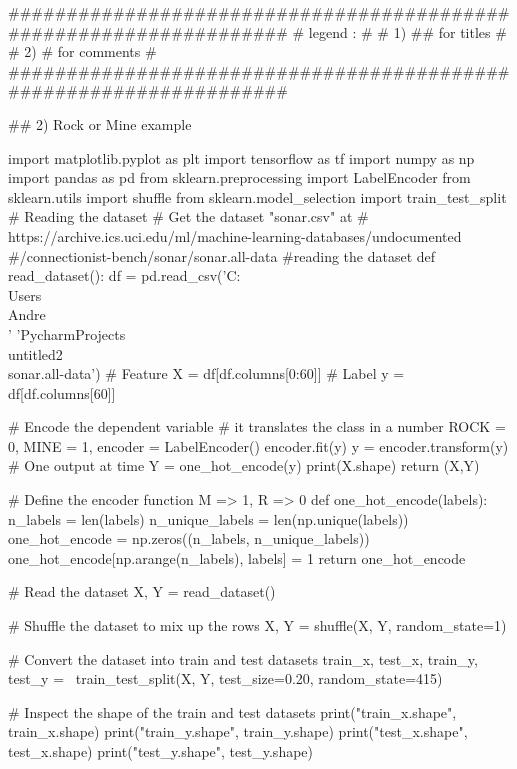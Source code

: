 \documentclass[11pt]{article}
\begin{document}
\begin{python}
###################################################################
# legend :                                                        #
#         1) ## for titles                                        #
#         2) #  for comments                                      #
###################################################################

## 2) Rock or Mine example

import matplotlib.pyplot as plt
import tensorflow as tf
import numpy as np
import pandas as pd
from sklearn.preprocessing import LabelEncoder
from sklearn.utils import shuffle
from sklearn.model_selection import train_test_split
# Reading the dataset
# Get the dataset "sonar.csv" at
# https://archive.ics.uci.edu/ml/machine-learning-databases/undocumented
#/connectionist-bench/sonar/sonar.all-data
#reading the dataset
def read_dataset():
    df = pd.read_csv('C:\\Users\\Andre\\'
                     'PycharmProjects\\untitled2\\sonar.all-data')
    # Feature
    X = df[df.columns[0:60]]
    # Label
    y = df[df.columns[60]]

    # Encode the dependent variable
    # it translates the class in a number ROCK = 0, MINE = 1,
    encoder = LabelEncoder()
    encoder.fit(y)
    y = encoder.transform(y)
    # One output at time
    Y = one_hot_encode(y)
    print(X.shape)
    return (X,Y)


# Define the encoder function M => 1, R => 0
def one_hot_encode(labels):
    n_labels = len(labels)
    n_unique_labels = len(np.unique(labels))
    one_hot_encode = np.zeros((n_labels, n_unique_labels))
    one_hot_encode[np.arange(n_labels), labels] = 1
    return one_hot_encode


# Read the dataset
X, Y = read_dataset()

# Shuffle the dataset to mix up the rows
X, Y = shuffle(X, Y, random_state=1)

# Convert the dataset into train and test datasets
train_x, test_x, train_y, test_y = \
    train_test_split(X, Y, test_size=0.20, random_state=415)

# Inspect the shape of the train and test datasets
print("train_x.shape", train_x.shape)
print("train_y.shape", train_y.shape)
print("test_x.shape", test_x.shape)
print("test_y.shape", test_y.shape)


\end{python}
\end{document}
